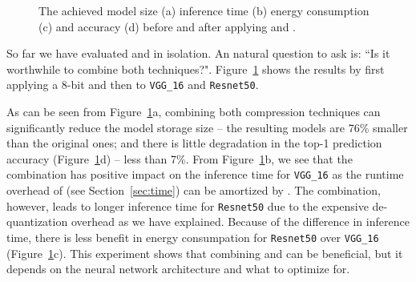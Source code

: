 \begin{figure}[!t]
\centering
{}
\hfill
{}
\hfill
{}
\hfill
{}
\hfill
\caption{The achieved model size (a) inference time (b) energy consumption (c) and accuracy (d) before and after applying \quantization and \pruning.
}
\vspace{-5mm}
\label{fig:combine}
\end{figure}

So far we have evaluated \pruning and \quantization in isolation. An natural question to ask is: ``Is it worthwhile to combine both
techniques?". Figure~\ref{fig:combine} shows the results by first applying a 8-bit \dquantization and then \pruning to \texttt{VGG\_16} and
\texttt{Resnet50}.


As can be seen from Figure~\ref{fig:combine}a, combining both compression techniques can significantly reduce the model storage size -- the
resulting models are 76\% smaller than the original ones; and there is little degradation in the top-1 prediction accuracy
(Figure~\ref{fig:combine}d) -- less than 7\%. From Figure~\ref{fig:combine}b, we see that the combination has positive impact on the
inference time for \texttt{VGG\_16} as the runtime overhead of \dquantization (see Section~\ref{sec:time}) can be amortized by \pruning.
The combination, however, leads to longer inference time for \texttt{Resnet50} due to the expensive de-quantization overhead as we have
explained. Because of the difference in inference time, there is less benefit in energy consumpation for \texttt{Resnet50} over
\texttt{VGG\_16} (Figure~\ref{fig:combine}c). This experiment shows that combining \pruning and \quantization can be beneficial, but it
depends on the neural network architecture and what to optimize for.
